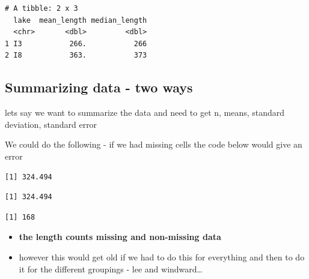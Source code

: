 \documentclass[
]{article}
\newenvironment{Shaded}{}{}
\newcommand{\AttributeTok}[1]{\textcolor[rgb]{0.84,0.23,0.29}{#1}}
\newcommand{\CommentTok}[1]{\textcolor[rgb]{0.42,0.45,0.49}{#1}}
\newcommand{\ConstantTok}[1]{\textcolor[rgb]{0.00,0.36,0.77}{#1}}
\newcommand{\FunctionTok}[1]{\textcolor[rgb]{0.44,0.26,0.76}{#1}}
\newcommand{\NormalTok}[1]{\textcolor[rgb]{0.14,0.16,0.18}{#1}}
\newcommand{\SpecialCharTok}[1]{\textcolor[rgb]{0.00,0.36,0.77}{#1}}
\begin{document}
\begin{verbatim}
# A tibble: 2 x 3
  lake  mean_length median_length
  <chr>       <dbl>         <dbl>
1 I3           266.           266
2 I8           363.           373
\end{verbatim}

\subsection{Summarizing data - two
ways}\label{summarizing-data---two-ways}

lets say we want to summarize the data and need to get n, means,
standard deviation, standard error

We could do the following - if we had missing cells the code below would
give an error

\begin{Shaded}
\end{Shaded}

\begin{verbatim}
[1] 324.494
\end{verbatim}

\begin{Shaded}
\end{Shaded}

\begin{verbatim}
[1] 324.494
\end{verbatim}

\begin{Shaded}
\end{Shaded}

\begin{verbatim}
[1] 168
\end{verbatim}

\begin{itemize}
\item
  \textbf{the length counts missing and non-missing data}
\item
  however this would get old if we had to do this for everything and
  then to do it for the different groupings - lee and windward\ldots{}
\end{itemize}
\end{document}
